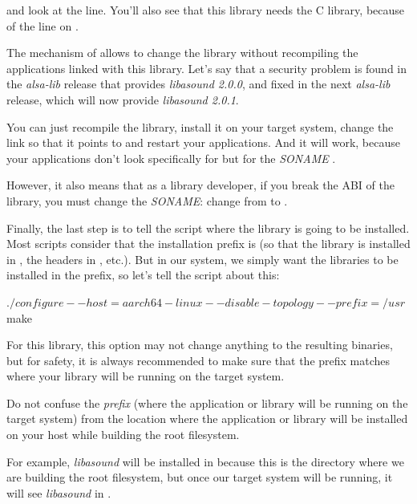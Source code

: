 and look at the  line. You'll also see that this
library needs the C library, because of the  line on
.

The mechanism of  allows to change the library without
recompiling the applications linked with this library. Let's say that
a security problem is found in the {\em alsa-lib} release that provides
{\em libasound 2.0.0}, and fixed in the next {\em alsa-lib} release, which will
now provide {\em libasound 2.0.1}.

You can just recompile the library, install it on your target system,
change the  link so that it points to
 and restart your applications. And it will
work, because your applications don't look specifically for
 but for the {\em SONAME}
.

However, it also means that as a library developer, if you break the
ABI of the library, you must change the {\em SONAME}: change from
 to .

Finally, the last step is to tell the  script where the
library is going to be installed. Most  scripts consider that
the installation prefix is  (so that the library is
installed in , the headers in
, etc.). But in our system, we simply want
the libraries to be installed in the  prefix, so let's tell
the  script about this:

\begin{bashinput}
$ ./configure --host=aarch64-linux --disable-topology --prefix=/usr
$ make
\end{bashinput}

For this library, this option may not change anything to the resulting
binaries, but for safety, it is always recommended to make sure that
the prefix matches where your library will be running on the target
system.

Do not confuse the {\em prefix} (where the application or library will
be running on the target system) from the location where the
application or library will be installed on your host while building
the root filesystem.

For example, {\em libasound} will be installed in
 because this is
the directory where we are building the root filesystem, but once our
target system will be running, it will see {\em libasound} in
.


